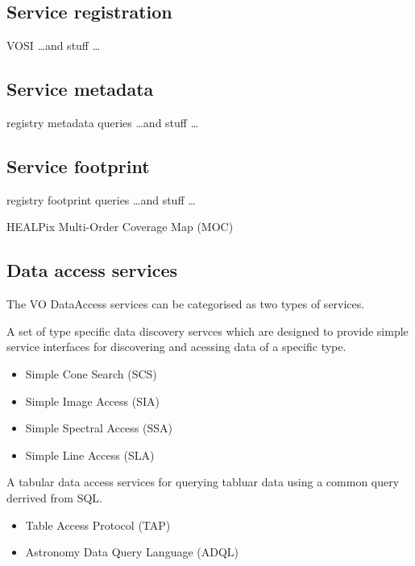 \documentclass{article}
\begin{document}
{\subsection{Service registration}

VOSI \ldots and stuff \ldots

\subsection{Service metadata}

registry metadata queries \ldots and stuff \ldots

\subsection{Service footprint}

registry footprint queries \ldots and stuff \ldots

HEALPix Multi-Order Coverage Map (MOC)

\subsection{Data access services}

The VO DataAccess services can be categorised as two types of services.

A set of type specific data discovery servces which are designed to provide
simple service interfaces for discovering and acessing data of a specific type.

\begin{itemize}
  \item Simple Cone Search (SCS)
  \item Simple Image Access (SIA)
  \item Simple Spectral Access (SSA)
  \item Simple Line Access (SLA)
\end{itemize}

A tabular data access services for querying tabluar data using a common query
derrived from SQL.

\begin{itemize}
  \item Table Access Protocol (TAP)
  \item Astronomy Data Query Language (ADQL)
\end{itemize}

}
\end{document}
